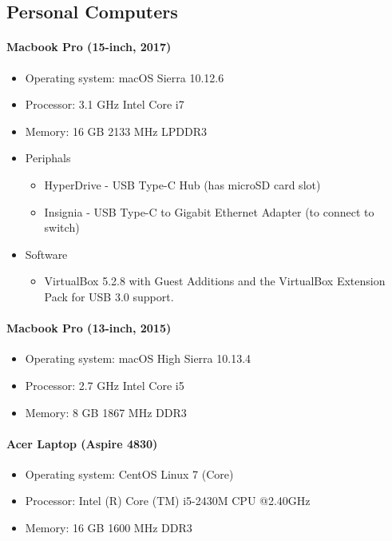 \subsection{Personal Computers}\label{ss:pcs}
\paragraph{Macbook Pro (15-inch, 2017)}
\begin{itemize}
\item Operating system: macOS Sierra 10.12.6 
\item Processor: 3.1 GHz Intel Core i7
\item Memory: 16 GB 2133 MHz LPDDR3
\item Periphals
\begin{itemize}
\item HyperDrive - USB Type-C Hub (has microSD card slot)
\item Insignia - USB Type-C to Gigabit Ethernet Adapter (to connect to switch)
\end{itemize}
\item Software
\begin{itemize}
\item VirtualBox 5.2.8 with Guest Additions and the VirtualBox Extension Pack for USB 3.0 support.
\end{itemize}
\end{itemize}

\paragraph{Macbook Pro (13-inch, 2015)}
\begin{itemize}
	\item Operating system: macOS High Sierra 10.13.4 
	\item Processor: 2.7 GHz Intel Core i5
	\item Memory: 8 GB 1867 MHz DDR3
\end{itemize}

\paragraph{Acer Laptop (Aspire 4830)}
\begin{itemize}
	\item Operating system: CentOS Linux 7 (Core)
	\item Processor: Intel (R) Core (TM) i5-2430M CPU @2.40GHz
	\item Memory: 16 GB 1600 MHz DDR3
\end{itemize}

